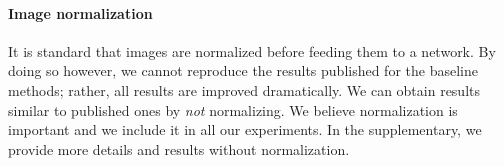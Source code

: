 \paragraph{Image normalization}

It is standard that images are normalized before feeding them to a network. By doing so however, we cannot reproduce the results published for the baseline methods; rather, all results are improved dramatically. We can obtain results similar to published ones by \emph{not} normalizing. We believe normalization is important and we include it in all our experiments. In the supplementary, we provide more details and results without normalization.
